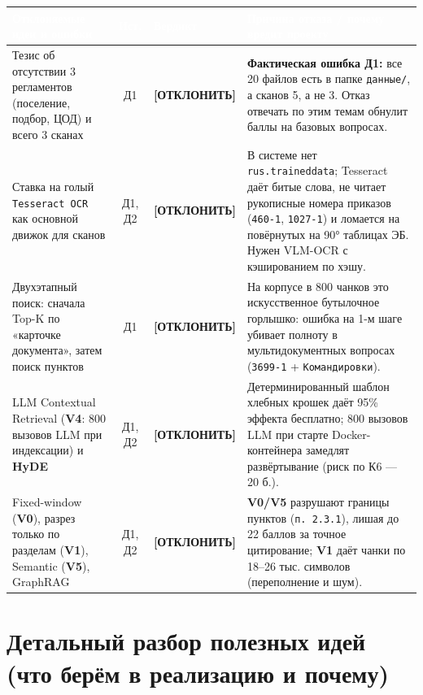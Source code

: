 \documentclass[10pt,a4paper]{article}
\newcommand{\reject}{\textbf{\textcolor{RedTag}{[ОТКЛОНИТЬ]}}}
\begin{document}
{\vspace{4pt}
\begin{tabularx}{\textwidth}{@{} >{\raggedright\arraybackslash}p{} c >{\raggedright\arraybackslash}p{} >{\raggedright\arraybackslash}X @{}}
\toprule
\rowcolor{HeaderBg}
\textcolor{white}{\textbf{Отклоняемые идеи и ошибки}} & \textcolor{white}{\textbf{Ист.}} & \textcolor{white}{\textbf{Вердикт}} & \textcolor{white}{\textbf{Причина отказа / почему вредит проекту}} \\
\midrule
Тезис об отсутствии 3 регламентов (поселение, подбор, ЦОД) и всего 3 сканах & Д1 & \reject & \textbf{Фактическая ошибка Д1:} все 20 файлов есть в папке \texttt{данные/}, а сканов 5, а не 3. Отказ отвечать по этим темам обнулит баллы на базовых вопросах. \\
Ставка на голый \texttt{Tesseract OCR} как основной движок для сканов & Д1, Д2 & \reject & В системе нет \texttt{rus.traineddata}; Tesseract даёт битые слова, не читает рукописные номера приказов (\texttt{460-1}, \texttt{1027-1}) и ломается на повёрнутых на 90° таблицах ЭБ. Нужен VLM-OCR с кэшированием по хэшу. \\
Двухэтапный поиск: сначала Top-K по «карточке документа», затем поиск пунктов & Д1 & \reject & На корпусе в 800 чанков это искусственное бутылочное горлышко: ошибка на 1-м шаге убивает полноту в мультидокументных вопросах (\texttt{3699-1} + \texttt{Командировки}). \\
LLM Contextual Retrieval (\textbf{V4}: 800 вызовов LLM при индексации) и \textbf{HyDE} & Д1, Д2 & \reject & Детерминированный шаблон хлебных крошек даёт 95\% эффекта бесплатно; 800 вызовов LLM при старте Docker-контейнера замедлят развёртывание (риск по К6 — 20 б.). \\
Fixed-window (\textbf{V0}), разрез только по разделам (\textbf{V1}), Semantic (\textbf{V5}), GraphRAG & Д1, Д2 & \reject & \textbf{V0/V5} разрушают границы пунктов (\texttt{п. 2.3.1}), лишая до 22 баллов за точное цитирование; \textbf{V1} даёт чанки по 18--26 тыс. символов (переполнение и шум). \\
\bottomrule
\end{tabularx}
}

\section{Детальный разбор полезных идей (что берём в реализацию и почему)}
\end{document}
